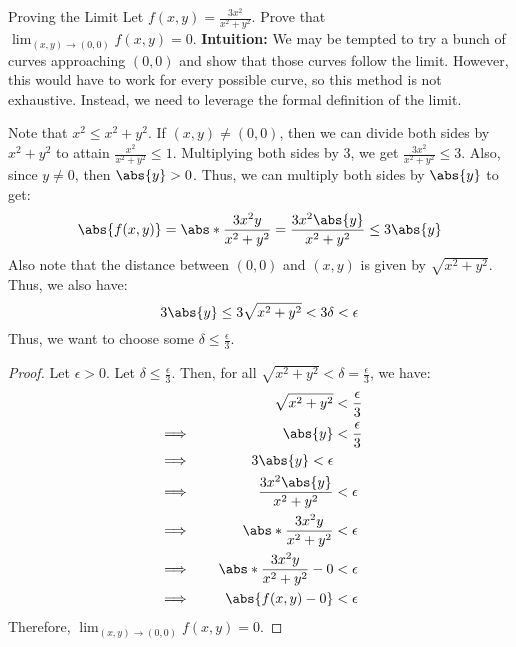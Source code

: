 \begin{exbox}{Proving the Limit}{}
    Let $f(x,y) = \frac{3x^2}{x^2+y^2}$. Prove that $\lim_{(x,y) \to (0,0)} f(x,y) = 0$.
    \tcblower
    \textbf{Intuition:} We may be tempted to try a bunch of curves approaching $(0,0)$ and show that those curves follow the limit. However, this would have to work for every possible curve, so this method is not exhaustive. Instead, we need to leverage the formal definition of the limit.

    Note that $x^2 \leq x^2 + y^2$. If $(x,y) \neq (0,0)$, then we can divide both sides by $x^2 + y^2$ to attain $\frac{x^2}{x^2 + y^2} \leq 1$. Multiplying both sides by $3$, we get $\frac{3x^2}{x^2 + y^2} \leq 3$. Also, since $y \neq 0$, then $\abs{y} > 0$. Thus, we can multiply both sides by $\abs{y}$ to get:
    \[ \abs{f(x,y)} = \abs*{\frac{3x^2 y}{x^2+y^2}} = \frac{3x^2 \abs{y}}{x^2 + y^2} \leq 3 \abs{y} \]
    Also note that the distance between $(0,0)$ and $(x,y)$ is given by $\sqrt{x^2 + y^2}$. Thus, we also have:
    \[ 3\abs{y} \leq 3\sqrt{x^2 + y^2} < 3 \delta < \epsilon \]
    Thus, we want to choose some $\delta \leq \frac{\epsilon}{3}$.
    \begin{proof}
        Let $\epsilon > 0$. Let $\delta \leq \frac{\epsilon}{3}$. Then, for all $\sqrt{x^2 + y^2} < \delta  = \frac{\epsilon}{3}$, we have:
        \begin{alignat*}{2}
            && \sqrt{x^2 + y^2} &< \frac{\epsilon}{3} \\
            & \implies \quad & \abs{y} &< \frac{\epsilon}{3} \\
            & \implies & 3\abs{y} < \epsilon \\
            & \implies & \frac{3x^2\abs{y}}{x^2 + y^2} &< \epsilon \\
            & \implies & \abs*{\frac{3x^2 y}{x^2 + y^2}} &< \epsilon \\
            & \implies & \abs*{\frac{3x^2 y}{x^2 + y^2} - 0} &< \epsilon \\
            & \implies & \abs{f(x,y) - 0} &< \epsilon
        \end{alignat*}
        Therefore, $\lim_{(x,y) \to (0,0)} f(x,y) = 0$.
    \end{proof}
\end{exbox}


